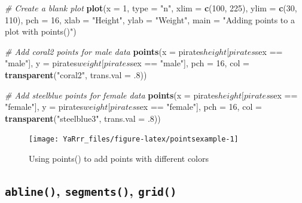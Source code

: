 \documentclass[]{book}
\newenvironment{Shaded}{\begin{snugshade}}{\end{snugshade}}
\newcommand{\KeywordTok}[1]{\textcolor[rgb]{0.13,0.29,0.53}{\textbf{{#1}}}}
\newcommand{\DataTypeTok}[1]{\textcolor[rgb]{0.13,0.29,0.53}{{#1}}}
\newcommand{\DecValTok}[1]{\textcolor[rgb]{0.00,0.00,0.81}{{#1}}}
\newcommand{\StringTok}[1]{\textcolor[rgb]{0.31,0.60,0.02}{{#1}}}
\newcommand{\CommentTok}[1]{\textcolor[rgb]{0.56,0.35,0.01}{\textit{{#1}}}}
\newcommand{\NormalTok}[1]{{#1}}
\theoremstyle{definition}
\theoremstyle{definition}
\theoremstyle{remark}
\begin{document}
\begin{Shaded}
\begin{Highlighting}[]
\CommentTok{# Create a blank plot}
\KeywordTok{plot}\NormalTok{(}\DataTypeTok{x =} \DecValTok{1}\NormalTok{,}
     \DataTypeTok{type =} \StringTok{"n"}\NormalTok{,}
     \DataTypeTok{xlim =} \KeywordTok{c}\NormalTok{(}\DecValTok{100}\NormalTok{, }\DecValTok{225}\NormalTok{), }
     \DataTypeTok{ylim =} \KeywordTok{c}\NormalTok{(}\DecValTok{30}\NormalTok{, }\DecValTok{110}\NormalTok{),}
     \DataTypeTok{pch =} \DecValTok{16}\NormalTok{,}
     \DataTypeTok{xlab =} \StringTok{"Height"}\NormalTok{, }
     \DataTypeTok{ylab =} \StringTok{"Weight"}\NormalTok{,}
     \DataTypeTok{main =} \StringTok{"Adding points to a plot with points()"}\NormalTok{)}

\CommentTok{# Add coral2 points for male data}
\KeywordTok{points}\NormalTok{(}\DataTypeTok{x =} \NormalTok{pirates$height[pirates$sex ==}\StringTok{ "male"}\NormalTok{],}
       \DataTypeTok{y =} \NormalTok{pirates$weight[pirates$sex ==}\StringTok{ "male"}\NormalTok{],}
       \DataTypeTok{pch =} \DecValTok{16}\NormalTok{,}
       \DataTypeTok{col =} \KeywordTok{transparent}\NormalTok{(}\StringTok{"coral2"}\NormalTok{, }\DataTypeTok{trans.val =} \NormalTok{.}\DecValTok{8}\NormalTok{))}

\CommentTok{# Add steelblue points for female data}
\KeywordTok{points}\NormalTok{(}\DataTypeTok{x =} \NormalTok{pirates$height[pirates$sex ==}\StringTok{ "female"}\NormalTok{],}
       \DataTypeTok{y =} \NormalTok{pirates$weight[pirates$sex ==}\StringTok{ "female"}\NormalTok{],}
       \DataTypeTok{pch =} \DecValTok{16}\NormalTok{,}
       \DataTypeTok{col =} \KeywordTok{transparent}\NormalTok{(}\StringTok{"steelblue3"}\NormalTok{, }\DataTypeTok{trans.val =} \NormalTok{.}\DecValTok{8}\NormalTok{))}
\end{Highlighting}
\end{Shaded}

\begin{figure}

{\centering \texttt{[image: YaRrr\_files/figure-latex/pointsexample-1]} 

}

\caption{Using points() to add points with different colors}\label{fig:pointsexample}
\end{figure}

\subsection{\texorpdfstring{\texttt{abline()}, \texttt{segments()},
\texttt{grid()}}{abline(), segments(), grid()}}\label{abline-segments-grid}
\end{document}
